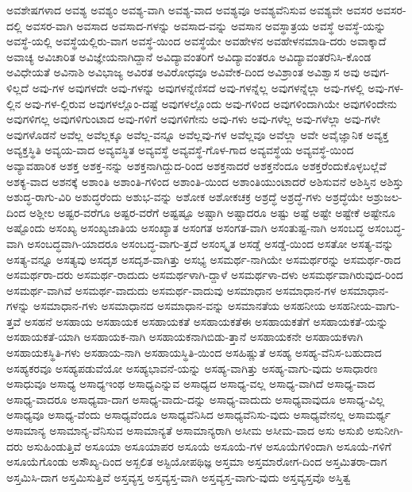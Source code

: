 {ಅವಶೇಷಗಳಾದ
ಅವಶ್ಯ
ಅವಶ್ಯಂ
ಅವಶ್ಯ-ವಾಗಿ
ಅವಶ್ಯ-ವಾದ
ಅವಶ್ಯವೂ
ಅವಶ್ಯವೆನಿಸುವ
ಅವಶ್ಯವೇ
ಅವಸರ
ಅವಸರ-ದಲ್ಲಿ
ಅವಸರ-ವಾಗಿ
ಅವಸಾದ
ಅವಸಾದ-ಗಳನ್ನು
ಅವಸಾದ-ವನ್ನು
ಅವಸಾನ
ಅವಸ್ಥಾತ್ರಯ
ಅವಸ್ಥೆ
ಅವಸ್ಥೆ-ಯನ್ನು
ಅವಸ್ಥೆ-ಯಲ್ಲಿ
ಅವಸ್ಥೆಯಲ್ಲಿರು-ವಾಗ
ಅವಸ್ಥೆ-ಯಿಂದ
ಅವಸ್ಥೆಯೇ
ಅವಹೇಳನ
ಅವಹೇಳನಮಾಡಿ-ದರು
ಅವಾಕ್ಕಾದೆ
ಅವಾಚ್ಯ
ಅವಿಚಾರಿತ
ಅವಿಜ್ಞೇಯನಾಗಿದ್ದಾನೆ
ಅವಿದ್ಯಾವಂತರಿಗೆ
ಅವಿದ್ಯಾವಂತರೂ
ಅವಿದ್ಯಾವಂತರೆನಿಸಿ-ಕೊಂಡ
ಅವಿಧೇಯತೆ
ಅವಿನಾಶಿ
ಅವಿಭಾಜ್ಯ
ಅವಿರತ
ಅವಿರೋಧವೂ
ಅವಿವೇಕ-ದಿಂದ
ಅವಿಶ್ರಾಂತ
ಅವಿಶ್ವಾಸ
ಅವು
ಅವುಗ-ಳಿಲ್ಲದೆ
ಅವು-ಗಳ
ಅವುಗಳದೇ
ಅವು-ಗಳನ್ನು
ಅವುಗಳನ್ನೆಣಿಸದೆ
ಅವು-ಗಳನ್ನೆಲ್ಲ
ಅವುಗಳನ್ನೆಲ್ಲಾ
ಅವು-ಗಳಲ್ಲಿ
ಅವು-ಗಳ-ಲ್ಲಿನ
ಅವು-ಗಳ-ಲ್ಲಿರುವ
ಅವುಗಳಲ್ಲೊಂ-ದಷ್ಟೆ
ಅವುಗಳಲ್ಲೊಂದು
ಅವು-ಗಳಿಂದ
ಅವುಗಳಿಂದಾಗಿಯೇ
ಅವುಗಳಿಂದೇನು
ಅವುಗಳಿಗಲ್ಲ
ಅವುಗಳಿಗುಂಟಾದ
ಅವು-ಗಳಿಗೆ
ಅವುಗಳಿಗೇನು
ಅವು-ಗಳು
ಅವು-ಗಳೆಲ್ಲ
ಅವು-ಗಳೆಲ್ಲಾ
ಅವು-ಗಳೇ
ಅವುಗಳೊಡನೆ
ಅವೆಲ್ಲ
ಅವೆಲ್ಲಕ್ಕೂ
ಅವೆಲ್ಲ-ವನ್ನೂ
ಅವೆಲ್ಲವು-ಗಳ
ಅವೆಲ್ಲವೂ
ಅವೆಲ್ಲಾ
ಅವೇ
ಅವೈಜ್ಞಾನಿಕ
ಅವ್ಯಕ್ತ
ಅವ್ಯಕ್ತಸ್ಥಿತಿ
ಅವ್ಯಯ-ವಾದ
ಅವ್ಯವಸ್ಥಿತ
ಅವ್ಯವಸ್ಥೆ
ಅವ್ಯವಸ್ಥೆ-ಗೊಳ-ಗಾದ
ಅವ್ಯವಸ್ಥೆಯ
ಅವ್ಯವಸ್ಥೆ-ಯಿಂದ
ಅವ್ಯಾವಹಾರಿಕ
ಅಶಕ್ತ
ಅಶಕ್ತ-ನನ್ನು
ಅಶಕ್ತನಾಗಿದ್ದುದ-ರಿಂದ
ಅಶಕ್ತನಾದರೆ
ಅಶಕ್ತನೆಂದೂ
ಅಶಕ್ತರೆಂದುಕೊಳ್ಳಬಲ್ಲೆವೆ
ಅಶಕ್ಯ-ವಾದ
ಅಶನಕ್ಕೆ
ಅಶಾಂತಿ
ಅಶಾಂತಿ-ಗಳಿಂದ
ಅಶಾಂತಿ-ಯಿಂದ
ಅಶಾಂತಿಯುಂಟಾದರೆ
ಅಶಿಸುವನೆ
ಅಶಿಸ್ತಿನ
ಅಶಿಸ್ತು
ಅಶುದ್ಧ-ರಾಗು-ವಿರಿ
ಅಶುದ್ಧರೆಂದು
ಅಶುಭ-ವನ್ನು
ಅಶೋಕ
ಅಶೋಕಚಕ್ರ
ಅಶ್ರದ್ಧೆ
ಅಶ್ರದ್ಧೆ-ಗಳು
ಅಶ್ರದ್ಧೆಯೇ
ಅಶ್ರುಜಲ-ದಿಂದ
ಅಶ್ಲೀಲ
ಅಷ್ಟರ-ವರೆಗೂ
ಅಷ್ಟರ-ವರೆಗೆ
ಅಷ್ಟಷ್ಟೂ
ಅಷ್ಟಾಗಿ
ಅಷ್ಟಾದರೂ
ಅಷ್ಟು
ಅಷ್ಟೆ
ಅಷ್ಟೇ
ಅಷ್ಟೇಕೆ
ಅಷ್ಟೇನೂ
ಅಷ್ಟೊಂದು
ಅಸಂಖ್ಯ
ಅಸಂಖ್ಯಜಾತಿಯ
ಅಸಂಖ್ಯಾತ
ಅಸಂಗತ
ಅಸಂಗತ-ವಾಗಿ
ಅಸಂತುಷ್ಟ-ನಾಗಿ
ಅಸಂಬದ್ಧ
ಅಸಂಬದ್ಧ-ವಾಗಿ
ಅಸಂಬದ್ಧವಾಗಿ-ಯಾದರೂ
ಅಸಂಬದ್ಧ-ವಾಗು-ತ್ತದೆ
ಅಸಂಸ್ಕೃತ
ಅಸಡ್ಡೆ
ಅಸಡ್ಡೆ-ಯಿಂದ
ಅಸತೋ
ಅಸತ್ಯ-ವನ್ನು
ಅಸತ್ಯ-ವನ್ನೂ
ಅಸತ್ಯವು
ಅಸದೃಶ
ಅಸದೃಶ-ವಾಗಿತ್ತು
ಅಸಭ್ಯ
ಅಸಮರ್ಥ-ನಾಗಿಯೇ
ಅಸಮರ್ಥರನ್ನು
ಅಸಮರ್ಥ-ರಾದ
ಅಸಮರ್ಥರಾ-ದರು
ಅಸಮರ್ಥ-ರಾದುದು
ಅಸಮರ್ಥಳಾಗಿ-ದ್ದಾಳೆ
ಅಸಮರ್ಥಳಾ-ದಳು
ಅಸಮರ್ಥವಾಗಿರುವುದ-ರಿಂದ
ಅಸಮರ್ಥ-ವಾಗಿವೆ
ಅಸಮರ್ಥ-ವಾದುದು
ಅಸಮರ್ಥ-ವಾದುವು
ಅಸಮಾಧಾನ
ಅಸಮಾಧಾನ-ಗಳ
ಅಸಮಾಧಾನ-ಗಳನ್ನು
ಅಸಮಾಧಾನ-ಗಳು
ಅಸಮಾಧಾನದ
ಅಸಮಾಧಾನ-ವನ್ನು
ಅಸಮಾನತೆಯ
ಅಸಹನೀಯ
ಅಸಹನೀಯ-ವಾಗು-ತ್ತವೆ
ಅಸಹನೆ
ಅಸಹಾಯ
ಅಸಹಾಯಕ
ಅಸಹಾಯಕತೆ
ಅಸಹಾಯಕತೆಈ
ಅಸಹಾಯಕತೆಗೆ
ಅಸಹಾಯಕತೆ-ಯನ್ನು
ಅಸಹಾಯಕತೆ-ಯಾಗಿ
ಅಸಹಾಯಕ-ನಾಗಿ
ಅಸಹಾಯಕನಾಗಿಬಿಡು-ತ್ತಾನೆ
ಅಸಹಾಯಕನೇ
ಅಸಹಾಯಕಳಾಗಿ
ಅಸಹಾಯಕಸ್ಥಿತಿ-ಗಳು
ಅಸಹಾಯ-ನಾಗಿ
ಅಸಹಾಯಸ್ಥಿತಿ-ಯಿಂದ
ಅಸಹಿಷ್ಣುತೆ
ಅಸಹ್ಯ
ಅಸಹ್ಯ-ವೆನಿಸ-ಬಹುದಾದ
ಅಸಹ್ಯಕರವೂ
ಅಸಹ್ಯಪಡುವೆಯೋ
ಅಸಹ್ಯಭಾವನೆ-ಯನ್ನು
ಅಸಹ್ಯ-ವಾಗಿತ್ತು
ಅಸಹ್ಯ-ವಾಗು-ವುದು
ಅಸಾಧಾರಣ
ಅಸಾಧುವೂ
ಅಸಾಧ್ಯ
ಅಸಾಧ್ಯಇಂಥ
ಅಸಾಧ್ಯಎನ್ನುವ
ಅಸಾಧ್ಯದ
ಅಸಾಧ್ಯ-ವಲ್ಲ
ಅಸಾಧ್ಯ-ವಾಗಿದೆ
ಅಸಾಧ್ಯ-ವಾದ
ಅಸಾಧ್ಯ-ವಾದರೂ
ಅಸಾಧ್ಯವಾ-ದಾಗ
ಅಸಾಧ್ಯ-ವಾದು-ದನ್ನು
ಅಸಾಧ್ಯ-ವಾದುದು
ಅಸಾಧ್ಯವಾವುದೂ
ಅಸಾಧ್ಯ-ವಿಲ್ಲ
ಅಸಾಧ್ಯವೂ
ಅಸಾಧ್ಯ-ವೆಂದು
ಅಸಾಧ್ಯವೆಂದೂ
ಅಸಾಧ್ಯವೆನಿಸಿದ
ಅಸಾಧ್ಯವೆನಿಸು-ವುದು
ಅಸಾಧ್ಯವೇನಲ್ಲ
ಅಸಾಮರ್ಥ್ಯ
ಅಸಾಮಾನ್ಯ
ಅಸಾಮಾನ್ಯ-ವೆನಿಸುವ
ಅಸಾಮಾನ್ಯತೆ
ಅಸಾಮಾನ್ಯರಾಗಿ
ಅಸೀಮ
ಅಸೀಮ-ವಾದ
ಅಸು
ಅಸುಖಿ
ಅಸುನೀಗಿ-ದರು
ಅಸುಹಿಂಡುತ್ತಿವೆ
ಅಸೂಯಾ
ಅಸೂಯಾಪರ
ಅಸೂಯೆ
ಅಸೂಯೆ-ಗಳ
ಅಸೂಯೆಗಳಿಂದಾಗಿ
ಅಸೂಯೆ-ಗಳಿಗೆ
ಅಸೂಯೆಗೊಂಡು
ಅಸೌಖ್ಯ-ದಿಂದ
ಅಸ್ಖಲಿತ
ಅಸ್ಟಿಯೋಪಥಿಜ್ಞ
ಅಸ್ತಮಾ
ಅಸ್ತಮಾರೋಗ-ದಿಂದ
ಅಸ್ತಮಿತರಾ-ದಾಗ
ಅಸ್ತಮಿಸಿ-ದಾಗ
ಅಸ್ತಮಿಸುತ್ತಿವೆ
ಅಸ್ತವ್ಯಸ್ತ
ಅಸ್ತವ್ಯಸ್ತ-ವಾಗಿ
ಅಸ್ತವ್ಯಸ್ತ-ವಾಗು-ವುದು
ಅಸ್ತವ್ಯಸ್ತವೊ
ಅಸ್ತಿತ್ವ
}

